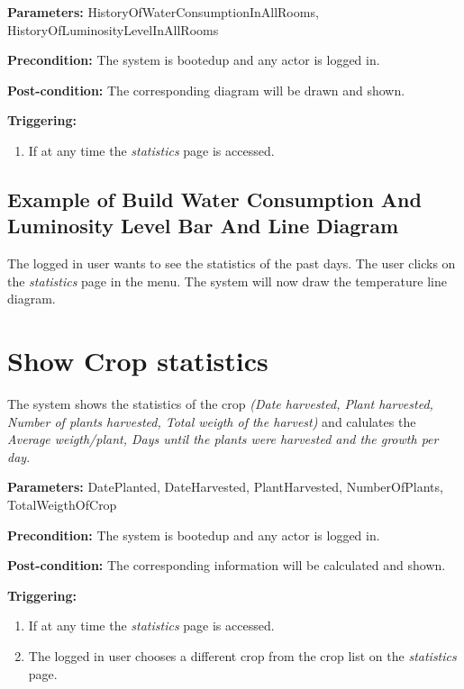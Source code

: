 \begin{description}

\item \textbf{Parameters:} HistoryOfWaterConsumptionInAllRooms,
HistoryOfLuminosityLevelInAllRooms
\item \textbf{Precondition:} The system is bootedup and any actor is logged in.
\item \textbf{Post-condition:} The corresponding diagram will be drawn and
shown.

\item \textbf{Triggering:}
\begin{enumerate}
\item If at any time the \emph{statistics} page is accessed.
\end{enumerate}
\end{description}

\subsection{Example of Build Water Consumption And Luminosity Level Bar And Line
Diagram}
The logged in user wants to see the statistics of the past days.
The user clicks on the \emph{statistics} page in the menu.
The system will now draw the temperature line diagram.




\section{Show Crop statistics}
\label{operation:ShowCropStatistics}
The system shows the statistics of the crop \emph{(Date harvested, Plant
harvested, Number of plants harvested, Total weigth of the harvest)} and
calulates the \emph{Average weigth/plant, Days until the plants were harvested
and the growth per day}.

\begin{description}

\item \textbf{Parameters:} DatePlanted, DateHarvested, PlantHarvested,
NumberOfPlants, TotalWeigthOfCrop
\item \textbf{Precondition:} The system is bootedup and any actor is logged in.
\item \textbf{Post-condition:} The corresponding information will be calculated
and shown.

\item \textbf{Triggering:}
\begin{enumerate}
\item If at any time the \emph{statistics} page is accessed.
\item The logged in user chooses a different crop from the crop list on the
\emph{statistics} page.
\end{enumerate}
\end{description}


